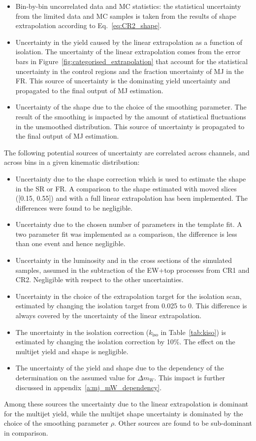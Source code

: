 %
\begin{itemize}
  \item Bin-by-bin uncorrelated data and MC statistics: the statistical uncertainty from the limited data and MC samples is taken from the results of shape extrapolation according to Eq.~\ref{eq:CR2_shape}.
  \item Uncertainty in the yield caused by the linear extrapolation as a function of isolation.
  The uncertainty of the linear extrapolation comes from the error bars in Figure~\ref{fig:categorised_extrapolation} that account for the statistical uncertainty in the control regions and the fraction uncertainty of MJ in the FR.
  This source of uncertainty is the dominating yield uncertainty and propagated to the final output of MJ estimation.
  \item Uncertainty of the shape due to the choice of the smoothing parameter. 
  The result of the smoothing is impacted by the amount of statistical fluctuations in the unsmoothed distribution.
  This source of uncertainty is propagated to the final output of MJ estimation.
\end{itemize}
%
The following potential sources of uncertainty are correlated across channels, and across bins in a given kinematic distribution:
%
\begin{itemize}
  \item Uncertainty due to the shape correction which is used to estimate the shape in the SR or FR.
  A comparison to the shape estimated with moved slices ([0.15, 0.55]) and with a full linear extrapolation has been implemented.
  The differences were found to be negligible.
  \item Uncertainty due to the chosen number of parameters in the template fit.
  A two parameter fit was implemented as a comparison, the difference is less than one event and hence negligible.
  \item Uncertainty in the luminosity and in the cross sections of the simulated samples, assumed in the subtraction of the EW+top processes from CR1 and CR2.
  Negligible with respect to the other uncertainties.
  \item Uncertainty in the choice of the extrapolation target for the isolation scan, estimated by changing the isolation target from 0.025 to 0.
  This difference is always covered by the uncertainty of the linear extrapolation.
  \item The uncertainty in the isolation correction ($k_{\text{iso}}$ in Table~\ref{tab:kiso}) is estimated by changing the isolation correction by 10\%.
  The effect on the multijet yield and shape is negligible.
  \item The uncertainty of the yield and shape due to the dependency of the determination on the assumed value for $\Delta m_W$.
  This impact is further discussed in appendix~\ref{a:mj_mW_dependency}.
\end{itemize}
%
Among these sources the uncertainty due to the linear extrapolation is dominant for the multijet yield, while the multijet shape uncertainty is dominated by the choice of the smoothing parameter $\rho$.
Other sources are found to be sub-dominant in comparison.


